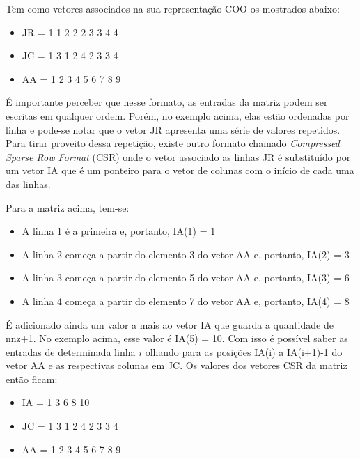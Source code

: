 Tem como vetores associados na sua representação COO os mostrados abaixo:


\begin{center}
    \begin{itemize}
        \item  JR = 1 1 2 2 2 3 3 4 4
        \item  JC = 1 3 1 2 4 2 3 3 4
        \item  AA = 1 2 3 4 5 6 7 8 9
    \end{itemize}
\end{center}


É importante perceber que nesse formato, as entradas da matriz podem ser escritas em qualquer ordem. Porém, no exemplo acima, elas estão ordenadas por linha e pode-se notar que o vetor JR apresenta uma série de valores repetidos. Para tirar proveito dessa repetição, existe outro formato chamado \textit{Compressed Sparse Row Format} (CSR) onde o vetor associado as linhas JR é substituído por um vetor IA que é um ponteiro para o vetor de colunas com o início de cada uma das linhas.

Para a matriz acima, tem-se:

\begin{itemize}
    \item A linha 1 é a primeira e, portanto, IA(1) = 1
    \item A linha 2 começa a partir do elemento 3 do vetor AA e, portanto, IA(2) = 3
    \item A linha 3 começa a partir do elemento 5 do vetor AA e, portanto, IA(3) = 6
    \item A linha 4 começa a partir do elemento 7 do vetor AA e, portanto, IA(4) = 8
\end{itemize}

É adicionado ainda um valor a mais ao vetor IA que guarda a quantidade de nnz+1. No exemplo acima, esse valor é IA(5) = 10. Com isso é possível saber as entradas de determinada linha $i$ olhando para as posições IA(i) a IA(i+1)-1 do vetor AA e as respectivas colunas em JC. Os valores dos vetores CSR da matriz então ficam:

\begin{center}
    \begin{itemize}
        \item IA = 1 3 6 8 10
        \item JC = 1 3 1 2 4 2 3 3 4
        \item AA = 1 2 3 4 5 6 7 8 9
    \end{itemize}
\end{center}


